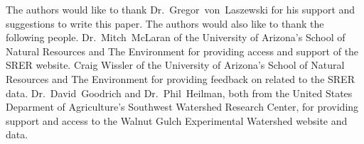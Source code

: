 \begin{acks}
The authors would like to thank Dr.~Gregor~von~Laszewski for his support 
and suggestions to write this paper.  The authors would also like to thank 
the following people.  Dr.~Mitch~McLaran of the University of Arizona's School 
of Natural Resources and The Environment for providing access and support of 
the SRER website.  Craig Wissler of the University of Arizona's School of 
Natural Resources and The Environment for providing feedback on related to the 
SRER data.  Dr.~David~Goodrich and Dr.~Phil~Heilman, both from the United 
States Deparment of Agriculture's Southwest Watershed Research Center, for 
providing support and access to the Walnut Gulch Experimental Watershed website 
and data.
\end{acks}


 
